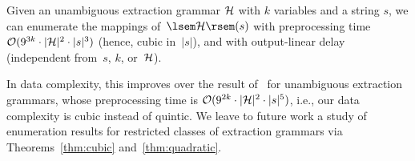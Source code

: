 \begin{theorem}
  Given an unambiguous extraction grammar $\mathcal{H}$ with $k$ variables and a string $s$, we can
  enumerate the mappings of~$\sem{\cH}(s)$ with preprocessing time 
  $\mathcal{O}(9^{3k} \cdot |\mathcal{H}|^2 \cdot |s|^3)$ (hence, cubic in~$|s|$), and with output-linear delay
  (independent from~$s$, $k$, or~$\mathcal{H}$).
\end{theorem}

%
%

In data complexity, this improves over the result of~\cite{Peterfreund21}
%
%
%
for unambiguous extraction grammars, whose preprocessing time is
$\mathcal{O}(9^{2k} \cdot |\mathcal{H}|^2 \cdot |s|^5)$, i.e.,
%
%
our data complexity is cubic instead of quintic.
%
%
%
%
We leave to future work a study of enumeration results for
restricted classes of extraction grammars via %
Theorems~\ref{thm:cubic} and~\ref{thm:quadratic}.
%


